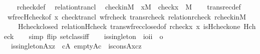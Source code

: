 \begin{isabellebody}
%
\isadelimproof
\ \ %
\endisadelimproof
%
\isatagproof
{}\isamarkupfalse%
\ rcheck{\isacharunderscore}{\kern0pt}def\ \isamarkupfalse%
\ relation{\isacharunderscore}{\kern0pt}trancl\ \isacommand{{\isachardot}{\kern0pt}}\isamarkupfalse%
%
\endisatagproof
{\isafoldproof}%
%
\isadelimproof
\isanewline
%
\endisadelimproof
\isanewline
{}\isamarkupfalse%
\ check{\isacharunderscore}{\kern0pt}in{\isacharunderscore}{\kern0pt}M\ {\isacharcolon}{\kern0pt}\ {\isachardoublequoteopen}x{\isasymin}M\ {\isasymLongrightarrow}\ check{\isacharparenleft}{\kern0pt}x{\isacharparenright}{\kern0pt}\ {\isasymin}\ M{\isachardoublequoteclose}\isanewline
%
\isadelimproof
\ \ %
\endisadelimproof
%
\isatagproof
{}\isamarkupfalse%
\ transrec{\isacharunderscore}{\kern0pt}def\isanewline
\ \ \isamarkupfalse%
\ wfrec{\isacharunderscore}{\kern0pt}Hcheck{\isacharbrackleft}{\kern0pt}of\ x{\isacharbrackright}{\kern0pt}\ check{\isacharunderscore}{\kern0pt}trancl\ wf{\isacharunderscore}{\kern0pt}rcheck\ trans{\isacharunderscore}{\kern0pt}rcheck\ relation{\isacharunderscore}{\kern0pt}rcheck\ rcheck{\isacharunderscore}{\kern0pt}in{\isacharunderscore}{\kern0pt}M\isanewline
\ \ \ \ Hcheck{\isacharunderscore}{\kern0pt}closed\ relation{}{\isacharunderscore}{\kern0pt}Hcheck\ trans{\isacharunderscore}{\kern0pt}wfrec{\isacharunderscore}{\kern0pt}closed{\isacharbrackleft}{\kern0pt}of\ {\isachardoublequoteopen}rcheck{\isacharparenleft}{\kern0pt}x{\isacharparenright}{\kern0pt}{\isachardoublequoteclose}\ x\ {\isachardoublequoteopen}is{\isacharunderscore}{\kern0pt}Hcheck{\isacharparenleft}{\kern0pt}one{\isacharparenright}{\kern0pt}{\isachardoublequoteclose}\ Hcheck{\isacharbrackright}{\kern0pt}\isanewline
\ \ \isamarkupfalse%
\ {\isacharparenleft}{\kern0pt}simp\ flip{\isacharcolon}{\kern0pt}\ setclass{\isacharunderscore}{\kern0pt}iff{\isacharparenright}{\kern0pt}%
\endisatagproof
{\isafoldproof}%
%
\isadelimproof
\isanewline
%
\endisadelimproof
\isanewline
{}\isamarkupfalse%
\ \isanewline
\isanewline
\isanewline
{}\isamarkupfalse%
\isanewline
\ \ is{\isacharunderscore}{\kern0pt}singleton\ {\isacharcolon}{\kern0pt}{\isacharcolon}{\kern0pt}\ {\isachardoublequoteopen}{\isacharbrackleft}{\kern0pt}i{\isasymRightarrow}o{\isacharcomma}{\kern0pt}i{\isacharcomma}{\kern0pt}i{\isacharbrackright}{\kern0pt}\ {\isasymRightarrow}\ o{\isachardoublequoteclose}\ \isanewline
\ \ {\isachardoublequoteopen}is{\isacharunderscore}{\kern0pt}singleton{\isacharparenleft}{\kern0pt}A{\isacharcomma}{\kern0pt}x{\isacharcomma}{\kern0pt}z{\isacharparenright}{\kern0pt}\ {\isasymequiv}\ {\isasymexists}c{\isacharbrackleft}{\kern0pt}A{\isacharbrackright}{\kern0pt}{\isachardot}{\kern0pt}\ empty{\isacharparenleft}{\kern0pt}A{\isacharcomma}{\kern0pt}c{\isacharparenright}{\kern0pt}\ {\isasymand}\ is{\isacharunderscore}{\kern0pt}cons{\isacharparenleft}{\kern0pt}A{\isacharcomma}{\kern0pt}x{\isacharcomma}{\kern0pt}c{\isacharcomma}{\kern0pt}z{\isacharparenright}{\kern0pt}{\isachardoublequoteclose}\isanewline

\end{isabellebody}
